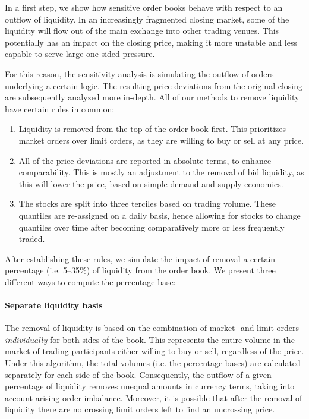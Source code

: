 \documentclass[11pt,a4paper, notitlepage]{article}
\begin{document}
	In a first step, we show how sensitive order books behave with respect to an outflow of liquidity. In an increasingly fragmented closing market, some of the liquidity will flow out of the main exchange into other trading venues. This potentially has an impact on the closing price, making it more unstable and less capable to serve large one-sided pressure.
	
	For this reason, the sensitivity analysis is simulating the outflow of orders underlying a certain logic. The resulting price deviations from the original closing are subsequently analyzed more in-depth. All of our methods to remove liquidity have certain rules in common:
	\begin{enumerate}
		\item Liquidity is removed from the top of the order book first. This prioritizes market orders over limit orders, as they are willing to buy or sell at any price.
		\item All of the price deviations are reported in absolute terms, to enhance comparability. This is mostly an adjustment to the removal of bid liquidity, as this will lower the price, based on simple demand and supply economics.
		\item  The stocks are split into three terciles based on trading volume. These quantiles are re-assigned on a daily basis, hence allowing for stocks to change quantiles over time after becoming comparatively more or less frequently traded.
	\end{enumerate}
	
	After establishing these rules, we simulate the impact of removal a certain percentage (i.e. 5--35\%) of liquidity from the order book. We present three different ways to compute the percentage base:
	
	\paragraph{Separate liquidity basis}
	The removal of liquidity is based on the combination of market- and limit orders \emph{individually} for both sides of the book. This represents the entire volume in the market of trading participants either willing to buy or sell, regardless of the price. Under this algorithm, the total volumes (i.e. the percentage bases) are calculated separately for each side of the book. Consequently, the outflow of a given percentage of liquidity removes unequal amounts in currency terms, taking into account arising order imbalance. Moreover, it is possible that after the removal of liquidity there are no crossing limit orders left to find an uncrossing price.
	
\end{document}
